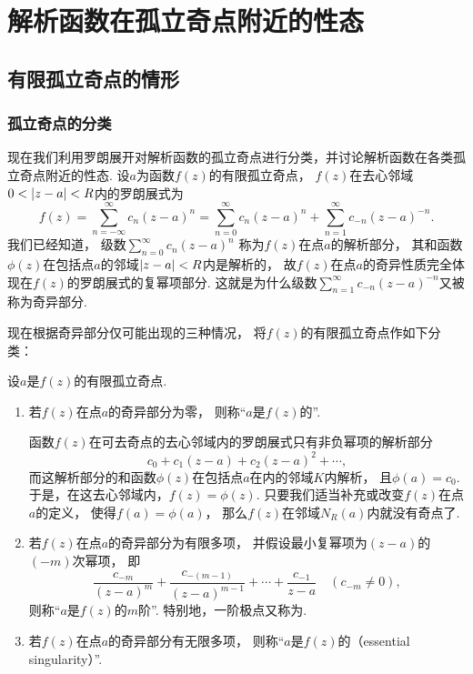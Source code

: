 \section{解析函数在孤立奇点附近的性态}
\subsection{有限孤立奇点的情形}
\subsubsection{孤立奇点的分类}
现在我们利用罗朗展开对解析函数的孤立奇点进行分类，并讨论解析函数在各类孤立奇点附近的性态.
设\(a\)为函数\(f(z)\)的有限孤立奇点，
\(f(z)\)在去心邻域\(0<\abs{z-a}<R\)内的罗朗展式为\[
	f(z) = \sum_{n=-\infty}^\infty c_n (z-a)^n
	= \sum_{n=0}^\infty c_n (z-a)^n
	+ \sum_{n=1}^\infty c_{-n} (z-a)^{-n}.
\]
我们已经知道，
级数\(\sum_{n=0}^\infty c_n (z-a)^n\)
称为\(f(z)\)在点\(a\)的解析部分，
其和函数\(\phi(z)\)在包括点\(a\)的邻域\(\abs{z-a}<R\)内是解析的，
故\(f(z)\)在点\(a\)的奇异性质完全体现在\(f(z)\)的罗朗展式的复幂项部分.
这就是为什么级数\(\sum_{n=1}^\infty c_{-n} (z-a)^{-n}\)又被称为奇异部分.

现在根据奇异部分仅可能出现的三种情况，
将\(f(z)\)的有限孤立奇点作如下分类：
\begin{definition}
设\(a\)是\(f(z)\)的有限孤立奇点.
\begin{enumerate}
	\item 若\(f(z)\)在点\(a\)的奇异部分为零，
	则称“\(a\)是\(f(z)\)的”.

	{\footnotesize
	函数\(f(z)\)在可去奇点的去心邻域内的罗朗展式只有非负幂项的解析部分\[
		c_0 + c_1 (z-a) + c_2 (z-a)^2 + \dotsb,
	\]
	而这解析部分的和函数\(\phi(z)\)在包括点\(a\)在内的邻域\(K\)内解析，
	且\(\phi(a) = c_0\).
	于是，在这去心邻域内，\(f(z) = \phi(z)\).
	只要我们适当补充或改变\(f(z)\)在点\(a\)的定义，
	使得\(f(a) = \phi(a)\)，
	那么\(f(z)\)在邻域\(N_R(a)\)内就没有奇点了.
	}

	\item 若\(f(z)\)在点\(a\)的奇异部分为有限多项，
	并假设最小复幂项为\((z-a)\)的\((-m)\)次幂项，
	即\[
		\frac{c_{-m}}{(z-a)^m} + \frac{c_{-(m-1)}}{(z-a)^{m-1}}
		+ \dotsb + \frac{c_{-1}}{z-a}
		\quad(c_{-m}\neq0),
	\]
	则称“\(a\)是\(f(z)\)的\(m\)阶”.
	特别地，一阶极点又称为.

	\item 若\(f(z)\)在点\(a\)的奇异部分有无限多项，
	则称“\(a\)是\(f(z)\)的（essential singularity）”.
\end{enumerate}
\end{definition}

